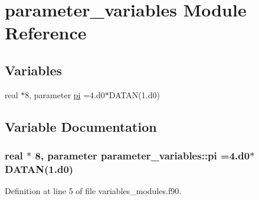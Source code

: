 \hypertarget{namespaceparameter__variables}{}\section{parameter\+\_\+variables Module Reference}
\label{namespaceparameter__variables}
\subsection*{Variables}
\begin{DoxyCompactItemize}
\item 
real $\ast$8, parameter \hyperlink{namespaceparameter__variables_a2379ce10254e090927e96805b35bac16}{pi} =4.d0$\ast$D\+A\+T\+AN(1.d0)
\end{DoxyCompactItemize}


\subsection{Variable Documentation}
\subsubsection[{\texorpdfstring{pi}{pi}}]{\setlength{\rightskip}{0pt plus 5cm}real $\ast$ 8, parameter parameter\+\_\+variables\+::pi =4.d0$\ast$D\+A\+T\+AN(1.d0)}\hypertarget{namespaceparameter__variables_a2379ce10254e090927e96805b35bac16}{}\label{namespaceparameter__variables_a2379ce10254e090927e96805b35bac16}


Definition at line 5 of file variables\+\_\+modules.\+f90.

